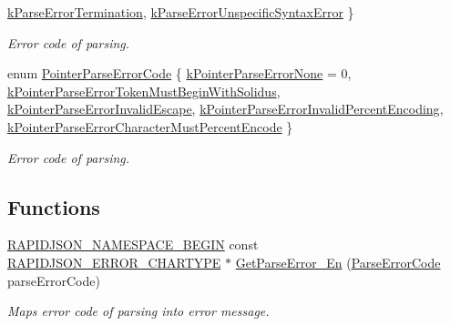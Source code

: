 \begin{DoxyCompactItemize}
\newline
\hyperlink{a00635_gga8d4b32dfc45840bca189ade2bbcb6ba7a6fed2d9a15f88540a1ba785f0de2cbe6}{k\+Parse\+Error\+Termination}, 
\hyperlink{a00635_gga8d4b32dfc45840bca189ade2bbcb6ba7a2bec6b26bddd3e093a37fc0d6399e0be}{k\+Parse\+Error\+Unspecific\+Syntax\+Error}
 \}\begin{DoxyCompactList}\small\item\em Error code of parsing. \end{DoxyCompactList}
\item 
enum \hyperlink{a00635_gacb2e274f33e54d91b96e9883a99a98be}{Pointer\+Parse\+Error\+Code} \{ \newline
\hyperlink{a00635_ggacb2e274f33e54d91b96e9883a99a98bea81e2b6fbd1bf4ac890ddb7779265e3a0}{k\+Pointer\+Parse\+Error\+None} = 0, 
\hyperlink{a00635_ggacb2e274f33e54d91b96e9883a99a98bea5821696a2ab6cbccdc8288cbe6e81c77}{k\+Pointer\+Parse\+Error\+Token\+Must\+Begin\+With\+Solidus}, 
\hyperlink{a00635_ggacb2e274f33e54d91b96e9883a99a98bea4d2a7e511d717fd1d2f532ef5fcf821b}{k\+Pointer\+Parse\+Error\+Invalid\+Escape}, 
\hyperlink{a00635_ggacb2e274f33e54d91b96e9883a99a98beac0c1b013c0db34dcc5a47fc1ee7a8c35}{k\+Pointer\+Parse\+Error\+Invalid\+Percent\+Encoding}, 
\newline
\hyperlink{a00635_ggacb2e274f33e54d91b96e9883a99a98beabd7eae93627f74267009a03679b6dc38}{k\+Pointer\+Parse\+Error\+Character\+Must\+Percent\+Encode}
 \}\begin{DoxyCompactList}\small\item\em Error code of parsing. \end{DoxyCompactList}
\end{DoxyCompactItemize}
\subsection*{Functions}
\begin{DoxyCompactItemize}
\item 
\hyperlink{a00636_gad3806c8251fdc7da9618b7e922674ffc}{R\+A\+P\+I\+D\+J\+S\+O\+N\+\_\+\+N\+A\+M\+E\+S\+P\+A\+C\+E\+\_\+\+B\+E\+G\+IN} const \hyperlink{a00635_ga7e4636fd48d0148f102b8a13f0539d8c}{R\+A\+P\+I\+D\+J\+S\+O\+N\+\_\+\+E\+R\+R\+O\+R\+\_\+\+C\+H\+A\+R\+T\+Y\+PE} $\ast$ \hyperlink{a00635_ga755b523205f46c980c80d12e230a3abd}{Get\+Parse\+Error\+\_\+\+En} (\hyperlink{a00635_ga8d4b32dfc45840bca189ade2bbcb6ba7}{Parse\+Error\+Code} parse\+Error\+Code)
\begin{DoxyCompactList}\small\item\em Maps error code of parsing into error message. \end{DoxyCompactList}\end{DoxyCompactItemize}



